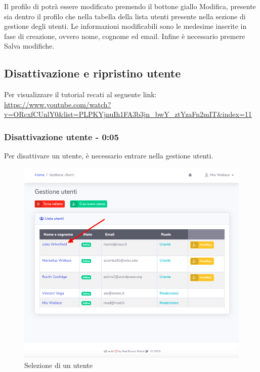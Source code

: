 		Il profilo di potrà essere modificato premendo il bottone giallo Modifica, presente sia dentro il profilo che nella tabella della lista utenti presente nella sezione di gestione degli utenti.
		Le informazioni modificabili sono le medesime inserite in fase di creazione, ovvero nome, cognome ed email.
		Infine è necessario premere Salva modifiche.



\subsection{Disattivazione e ripristino utente}
Per visualizzare il tutorial recati al seguente link: 
\url{https://www.youtube.com/watch?v=ORcxfCUnlY0&list=PLPKYjnuIh1FA3b3jn_bwY_ztYzaFn2mIT&index=11}

	\subsubsection{Disattivazione utente - 0:05}
		Per disattivare un utente, è necessario entrare nella gestione utenti.
		\begin{figure}[H]
		\centering
		\includegraphics[scale=0.600]{res/images/mod/selUtente.png}
		\caption{Selezione di un utente}
	\end{figure}
